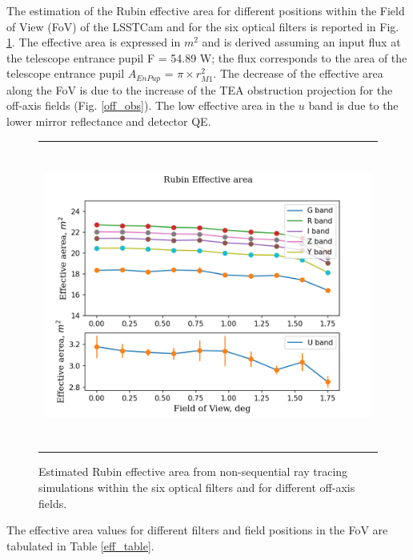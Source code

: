 \documentclass[SE,authoryear,toc]{lsstdoc}
\begin{document}
The estimation of the Rubin effective area for different positions within the Field of View (FoV) of the LSSTCam and for the six optical filters is reported in Fig. \ref{eff}. The effective area is expressed in $m^2$ and is derived assuming an input flux at the telescope entrance pupil F = 54.89 W; the flux corresponds to the area of the telescope entrance pupil $A_{EnPup}$ = $\pi\times r_{M1}^2$. The decrease of the effective area along the FoV is due to the increase of the TEA obstruction projection for the off-axis fields (Fig. \ref{off_obs}). The low effective area in the $u$ band is due to the lower mirror reflectance and detector QE.


\begin{figure}
\begin{center}
\begin{tabular}{c}
\includegraphics[height=10cm]{Rubin_effective_area_TEA_cad}
\end{tabular}
\end{center}
\caption 
{ \label{eff} Estimated Rubin effective area from non-sequential ray tracing simulations within the six optical filters and for different off-axis fields.}
\end{figure} 



The effective area values for different filters and field positions in the FoV are tabulated in Table \ref{eff_table}. 
\end{document}
